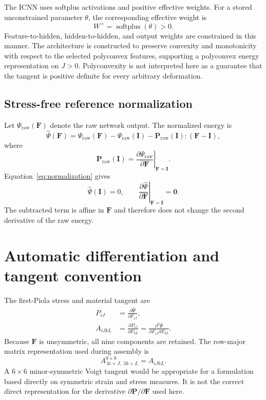 \documentclass[11pt,a4paper]{article}
\newcommand{\F}{\mathbf{F}}
\newcommand{\Pstress}{\mathbf{P}}
\newcommand{\Iten}{\mathbf{I}}
\begin{document}
The ICNN uses softplus activations and positive effective weights. For a
stored unconstrained parameter $\theta$, the corresponding effective weight
is
\begin{equation}
  W^+ = \operatorname{softplus}(\theta)>0.
\end{equation}
Feature-to-hidden, hidden-to-hidden, and output weights are constrained in
this manner. The architecture is constructed to preserve convexity and
monotonicity with respect to the selected polyconvex features, supporting a
polyconvex energy representation on $J>0$. Polyconvexity is not interpreted
here as a guarantee that the tangent is positive definite for every arbitrary
deformation.

\subsection{Stress-free reference normalization}

Let $\Psi_{\mathrm{raw}}(\F)$ denote the raw network output. The normalized
energy is
\begin{equation}
  \widehat{\Psi}(\F)
  =
  \Psi_{\mathrm{raw}}(\F)
  -\Psi_{\mathrm{raw}}(\Iten)
  -\Pstress_{\mathrm{raw}}(\Iten):(\F-\Iten),
  \label{eq:normalization}
\end{equation}
where
\begin{equation}
  \Pstress_{\mathrm{raw}}(\Iten)
  =
  \left.
  \frac{\partial\Psi_{\mathrm{raw}}}{\partial\F}
  \right|_{\F=\Iten}.
\end{equation}
Equation~\eqref{eq:normalization} gives
\begin{equation}
  \widehat{\Psi}(\Iten)=0,
  \qquad
  \left.
  \frac{\partial\widehat{\Psi}}{\partial\F}
  \right|_{\F=\Iten}
  =\mathbf{0}.
\end{equation}
The subtracted term is affine in $\F$ and therefore does not change the
second derivative of the raw energy.

\section{Automatic differentiation and tangent convention}

The first-Piola stress and material tangent are
\begin{align}
  P_{iJ}
  &=
  \frac{\partial\widehat{\Psi}}{\partial F_{iJ}},\\
  A_{iJkL}
  &=
  \frac{\partial P_{iJ}}{\partial F_{kL}}
  =
  \frac{\partial^2\widehat{\Psi}}
       {\partial F_{iJ}\partial F_{kL}}.
  \label{eq:tangent}
\end{align}
Because $\F$ is unsymmetric, all nine components are retained. The row-major
matrix representation used during assembly is
\begin{equation}
  A^{9\times9}_{\,3i+J,\;3k+L}=A_{iJkL}.
  \label{eq:flattening}
\end{equation}
A $6\times6$ minor-symmetric Voigt tangent would be appropriate for a
formulation based directly on symmetric strain and stress measures. It is not
the correct direct representation for the derivative
$\partial\Pstress/\partial\F$ used here.
\end{document}
